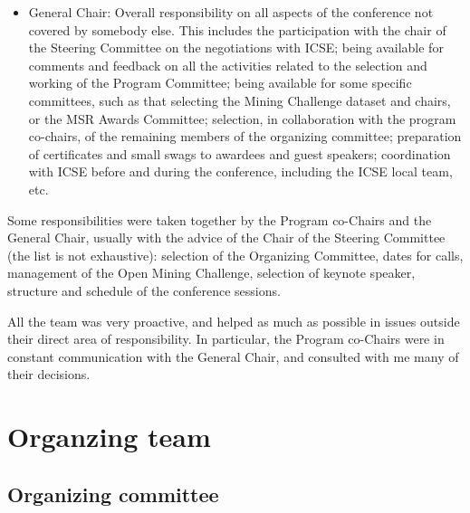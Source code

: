 \documentclass[a4paper]{report}
\begin{document}
\begin{itemize}
\item General Chair: Overall responsibility on all aspects of the conference not covered by somebody else. This includes the participation with the chair of the Steering Committee on the negotiations with ICSE; being available for comments and feedback on all the activities related to the selection and working of the Program Committee; being available for some specific committees, such as that selecting the Mining Challenge dataset and chairs, or the MSR Awards Committee; selection, in collaboration with the program co-chairs, of the remaining members of the organizing committee; preparation of certificates and small swags to awardees and guest speakers; coordination with ICSE before and during the conference, including the ICSE local team, etc.
\end{itemize}

Some responsibilities were taken together by the Program co-Chairs and the General Chair, usually with the advice of the Chair of the Steering Committee (the list is not exhaustive): selection of the Organizing Committee, dates for calls, management of the Open Mining Challenge, selection of keynote speaker, structure and schedule of the conference sessions.

All the team was very proactive, and helped as much as possible in issues outside their direct area of responsibility. In particular, the Program co-Chairs were in constant communication with the General Chair, and consulted with me many of their decisions.

\appendix

\chapter{Organzing team}

\section{Organizing committee}
\end{document}
